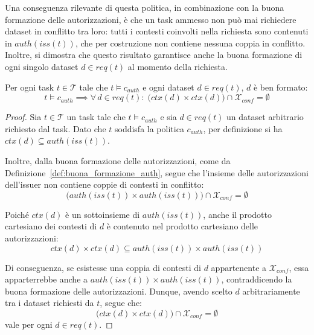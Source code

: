 Una conseguenza rilevante di questa politica, in combinazione con la buona formazione delle autorizzazioni, è che un task ammesso non può mai richiedere dataset in conflitto tra loro: tutti i contesti coinvolti nella richiesta sono contenuti in $auth(iss(t))$, che per costruzione non contiene nessuna coppia in conflitto. Inoltre, si dimostra che questo risultato garantisce anche la buona formazione di ogni singolo dataset $d \in req(t)$ al momento della richiesta.

\begin{theorem}
    \label{teo:buona_formazione_richiesti}
    Per ogni task $t \in \mathcal{T}$ tale che $t \models c_{auth}$ e ogni dataset $d \in req(t)$, $d$ è ben formato:
    \begin{equation}
        t \models c_{auth}
        \implies
        \forall\, d \in req(t):\;
        \bigl(ctx(d) \times ctx(d)\bigr) \cap \mathcal{X}_{conf} = \emptyset
    \end{equation}
    \begin{proof}
    Sia $t \in \mathcal{T}$ un task tale che $t \models c_{auth}$ e sia $d \in req(t)$ un dataset arbitrario richiesto dal task. Dato che $t$ soddisfa la politica $c_{auth}$, per definizione si ha $ctx(d) \subseteq auth(iss(t))$.
    
    Inoltre, dalla buona formazione delle autorizzazioni, come da Definizione~\ref{def:buona_formazione_auth}, segue che l'insieme delle autorizzazioni dell'issuer non contiene coppie di contesti in conflitto:
    \begin{equation}
        \bigl(auth(iss(t)) \times auth(iss(t))\bigr) \cap \mathcal{X}_{conf} = \emptyset
    \end{equation}
    
    Poiché $ctx(d)$ è un sottoinsieme di $auth(iss(t))$, anche il prodotto cartesiano dei contesti di $d$ è contenuto nel prodotto cartesiano delle autorizzazioni:
    \begin{equation}
        ctx(d) \times ctx(d) \subseteq auth(iss(t)) \times auth(iss(t))
    \end{equation}
    
    Di conseguenza, se esistesse una coppia di contesti di $d$ appartenente a $\mathcal{X}_{conf}$, essa apparterrebbe anche a $auth(iss(t)) \times auth(iss(t))$, contraddicendo la buona formazione delle autorizzazioni. Dunque, avendo scelto $d$ arbitrariamente tra i dataset richiesti da $t$, segue che:
    \begin{equation}
        \bigl(ctx(d) \times ctx(d)\bigr) \cap \mathcal{X}_{conf} = \emptyset
    \end{equation}
    vale per ogni $d \in req(t)$.
    \end{proof}
\end{theorem}

